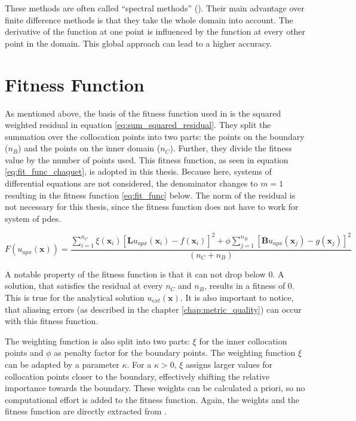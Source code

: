 \documentclass[./\jobname.tex]{subfiles}
\begin{document}
These methods are often called ``spectral methods'' (\cite{shen_spectral_2011}). Their main advantage over finite difference methods is that they take the whole domain into account. The derivative of the function at one point is influenced by the function at every other point in the domain. This global approach can lead to a higher accuracy. 

\section{Fitness Function}
\label{chap:fit_func}

As mentioned above, the basis of the fitness function used in \cite{chaquet_using_2019} is the squared weighted residual in equation \eqref{eq:sum_squared_residual}. They split the summation over the collocation points into two parts: the points on the boundary ($n_B$) and the points on the inner domain ($n_C$). Further, they divide the fitness value by the number of points used. This fitness function, as seen in equation \eqref{eq:fit_func_chaquet}, is adopted in this thesis. Because here, systems of differential equations are not considered, the denominator changes to $m=1$ resulting in the fitness function \eqref{eq:fit_func} below. The norm of the residual is not necessary for this thesis, since the fitness function does not have to work for system of \gls{pde}s.

\begin{equation}
\label{eq:fit_func}
F(u_{apx}(\mathbf{x})) = \frac{\sum_{i=1}^{n_C} \xi (\mathbf{x}_i) \left[ \mathbf{L}u_{apx}(\mathbf{x}_i) - f(\mathbf{x}_i) \right]^2 + \phi \sum_{j=1}^{n_B} \left[ \mathbf{B}u_{apx}(\mathbf{x}_j) - g(\mathbf{x}_j)\right]^2}{(n_C + n_B)}  
\end{equation}

A notable property of the fitness function is that it can not drop below 0. A solution, that satisfies the residual at every $n_C$ and $n_B$, results in a fitness of 0. This is true for the analytical solution $u_{ext}(\mathbf{x})$. It is also important to notice, that aliasing errors (as described in the chapter \ref{chap:metric_quality}) can occur with this fitness function. 

The weighting function is also split into two parts: $\xi$ for the inner collocation points and $\phi$ as penalty factor for the boundary points. The weighting function $\xi$ can be adapted by a parameter $\kappa$. For a $\kappa > 0$, $\xi$ assigns larger values for collocation points closer to the boundary, effectively shifting the relative importance towards the boundary. These weights can be calculated a priori, so no computational effort is added to the fitness function. Again, the weights and the fitness function are directly extracted from \cite{chaquet_using_2019}. 
\end{document}

